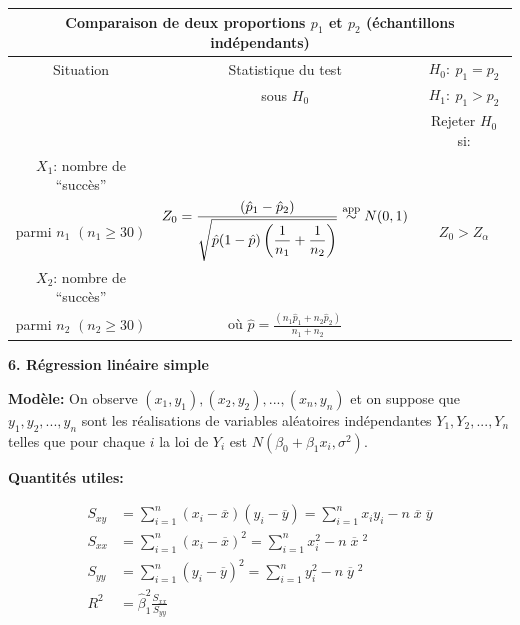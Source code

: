 \documentclass [12pt]{article}
\begin{document}
\begin{center}
\begin{tabular}{|c|c|c|}
\hline \multicolumn{3}{|c|}{{\bf Comparaison de deux proportions
$p_{1}$ et $p_{2}$ (échantillons indépendants)}}
\\
\hline Situation & Statistique du test & $H_{0}:\  p_{1} =
p_{2}$
\\
& sous $H_{0}$ & $H_{1}:\  p_{1} > p_{2}$
\\
&  & Rejeter $H_{0}$ si:
\\
\hline \hline $X_{1}$: nombre de ``succès'' &   &
\\
parmi $n_{1}$ $(n_{1} \geq 30)$ & $\displaystyle Z_0 = \frac{(\hat
p_1 - \hat p_2)} {\sqrt{\displaystyle\hat p (1-\hat p) \left(
\frac{1}{n_1} + \frac{1}{n_2} \right)}} \stackrel{{\rm app}}{\sim}
N(0,1)$ & $Z_0 > Z_{\alpha}$
\\
$X_{2}$: nombre de ``succès'' &  &
\\
parmi $n_{2}$ $(n_{2} \geq 30)$ & où $\displaystyle \hat p =
\frac{(n_1 \hat{p}_1 + n_2 \hat{p}_2)}{n_1 + n_2}$ &
\\
\hline
\end{tabular}
\end{center}

\newpage

{\large\bf 6. Régression linéaire simple}


\vspace{0.5cm}

\textbf{Modèle:}  On observe $(x_1,y_1), (x_2, y_2),..., (x_n,y_n)$ et on
suppose que $y_1, y_2,..., y_n$ sont les réalisations de
variables aléatoires indépendantes $Y_1, Y_2,..., Y_n$ telles
que pour chaque $i$ la loi de $Y_i$ est $N(\beta_0 + \beta_1 x_i,
\sigma^2)$.

\vspace{0.1 in}

\textbf{Quantités utiles:} 

\vspace{-0.4 in}
\begin{align*}
S_{xy}&=\sum\limits_{i=1}^n (x_i-\overline
x)(y_i-\overline y) =  \sum\limits_{i=1}^n x_iy_i - n\;\overline
x\;\overline y \\
S_{xx} &=\sum\limits_{i=1}^n (x_i-\overline x)^2 =
\sum\limits_{i=1}^n x_i^2 - n\;\overline x\;^2\\
S_{yy} &=\sum\limits_{i=1}^n (y_i-\overline y)^2 =
\sum\limits_{i=1}^n y_i^2 - n\;\overline y\;^2 \\
R^2 &= \hat{\beta}_1^2 \frac{S_{xx}}{S_{yy}}
\end{align*}
\end{document}
